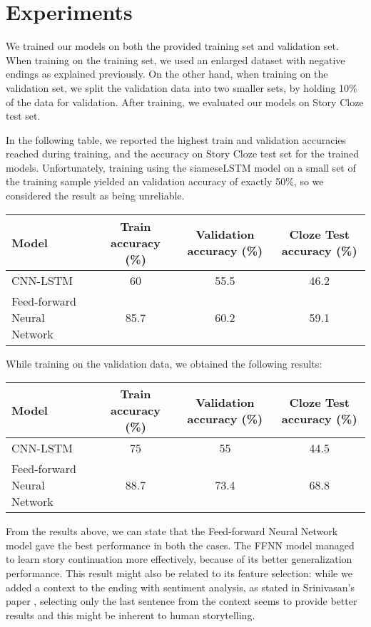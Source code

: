\documentclass{article}
\begin{document}
\section{Experiments}

We trained our models on both the provided training set and validation set. When training on the training set, we used an enlarged dataset with negative endings as explained previously. On the other hand, when training on the validation set, we split the validation data into two smaller sets, by holding 10\% of the data for validation. After training, we evaluated our models on Story Cloze test set.

In the following table, we reported the highest train and validation accuracies reached during training, and the accuracy on Story Cloze test set for the trained models. Unfortunately, training using the siameseLSTM model on a small set of the training sample yielded an validation accuracy of exactly 50\%, so we considered the result as being unreliable.
\begin{center}
	\scriptsize{
		\begin{tabular}{|l|c|c|c|}
			\hline Model & Train accuracy (\%) & Validation accuracy (\%) & Cloze Test accuracy (\%)\\
			\hline CNN-LSTM       & 60 & 55.5 &  46.2\\
			\hline Feed-forward Neural Network & 85.7  & 60.2 & 59.1\\
			\hline
	    \end{tabular}
	}
\end{center}

While training on the validation data, we obtained the following results:
\begin{center}
	\scriptsize{
		\begin{tabular}{|l|c|c|c|}
			\hline Model & Train accuracy (\%) & Validation accuracy (\%) & Cloze Test accuracy (\%)\\
			\hline CNN-LSTM       &  75  & 55 & 44.5 \\
			\hline Feed-forward Neural Network & 88.7  & 73.4 & 68.8\\
			\hline
	    \end{tabular}
	}
\end{center}

From the results above, we can state that the Feed-forward Neural Network model gave the best performance in both the cases. The FFNN model managed to learn story continuation more effectively, because of its better generalization performance. This result might also be related to its feature selection: while we added a context to the ending with sentiment analysis, as stated in Srinivasan's paper \cite{ffnn}, selecting only the last sentence from the context seems to provide better results and this might be inherent to human storytelling.
\end{document}
